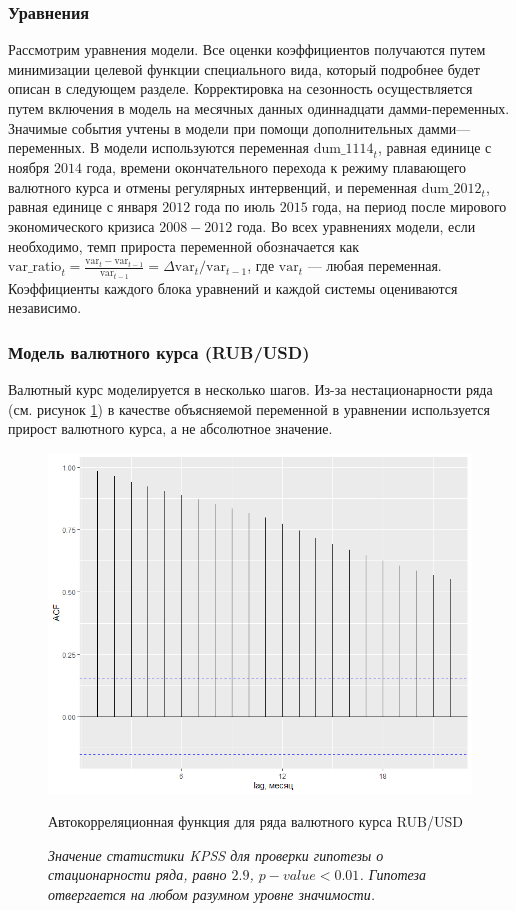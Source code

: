 \documentclass[a4paper, 14pt]{extarticle}
\begin{document}
\subsubsection{Уравнения}
Рассмотрим уравнения модели.
Все оценки коэффициентов получаются путем минимизации целевой функции специального вида, который подробнее будет описан в следующем разделе.
Корректировка на сезонность осуществляется путем включения в модель на месячных данных одиннадцати дамми-переменных.
Значимые события учтены в модели при помощи дополнительных дамми—переменных.
В модели используются переменная $\text{dum\_1114}_t$, равная единице с ноября $2014$ года, времени окончательного перехода к режиму плавающего валютного курса и отмены регулярных интервенций,  и переменная $\text{dum\_2012}_t$, равная единице с января $2012$ года по июль $2015$ года, на период после мирового экономического кризиса $2008-2012$ года.
Во всех уравнениях модели, если необходимо, темп прироста переменной обозначается как $\text{var\_ratio}_{t} = \frac{\text{var}_t -\text{var}_{t-1}}{\text{var}_{t-1}} = \Delta \text{var}_t / \text{var}_{t-1}$, где $\text{var}_{t}$ — любая переменная.
Коэффициенты каждого блока уравнений и каждой системы оцениваются независимо.

\subsubsection*{Модель валютного курса (RUB/USD)}

Валютный курс моделируется в несколько шагов. 
Из-за нестационарности ряда (см. рисунок \ref{fi:2}) в качестве объясняемой переменной в уравнении используется прирост валютного курса, а не абсолютное значение.

\vspace{2cm}

\begin{figure}[htp!]
	\centering
	\includegraphics[width=14cm]{acf_rub_usd.png}
	\caption{Автокорреляционная функция для ряда валютного курса RUB/USD}\label{fi:2}
	\captionsetup{justification=centering,margin=0.5cm}
	\caption*{\textit{Значение статистики KPSS для проверки гипотезы о стационарности ряда, равно $2.9$, $p-value <0.01$. Гипотеза отвергается на любом разумном уровне значимости.}}
\end{figure}
\end{document}
